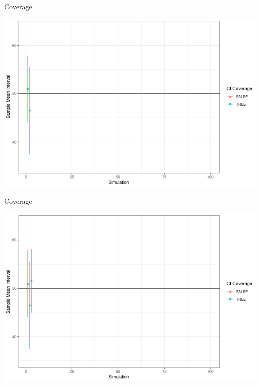 \documentclass{beamer}
\begin{document}
\begin{frame}{Coverage}
\begin{center}
\includegraphics[scale=0.5]{cover2.png}
\end{center}
\end{frame}

\begin{frame}{Coverage}
\begin{center}
\includegraphics[scale=0.5]{cover3.png}
\end{center}
\end{frame}
\end{document}
